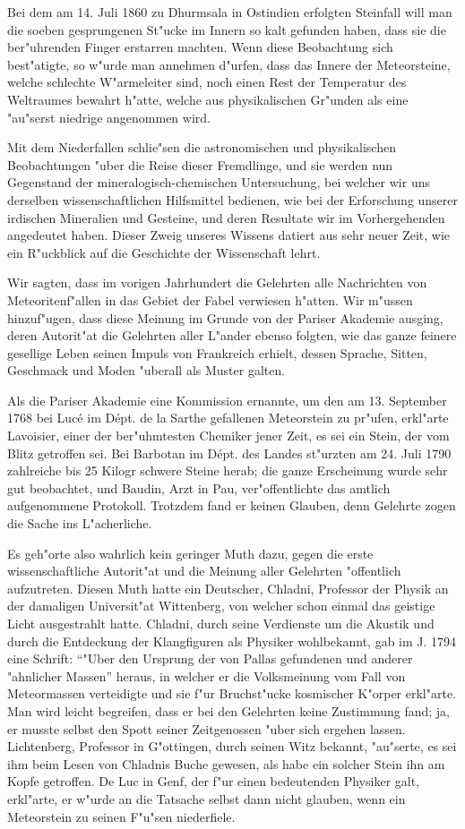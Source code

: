 \documentclass[a4paper, 11pt, oneside]{article}
\begin{document}
Bei dem am 14. Juli 1860 zu Dhurmsala in Ostindien erfolgten Steinfall will man die soeben gesprungenen St"ucke im Innern so kalt gefunden haben, dass sie die ber"uhrenden Finger erstarren machten. Wenn diese Beobachtung sich best"atigte, so w"urde man annehmen d"urfen, dass das Innere der Meteorsteine, welche schlechte W"armeleiter sind, noch einen Rest der Temperatur des Weltraumes bewahrt h"atte, welche aus physikalischen Gr"unden als eine "au"serst niedrige angenommen wird.

Mit dem Niederfallen schlie"sen die astronomischen und physikalischen Beobachtungen "uber die Reise dieser Fremdlinge, und sie werden nun Gegenstand der mineralogisch-chemischen Untersuchung, bei welcher wir uns derselben wissenschaftlichen Hilfsmittel bedienen, wie bei der Erforschung unserer irdischen Mineralien und Gesteine, und deren Resultate wir im Vorhergehenden angedeutet haben. Dieser Zweig unseres Wissens datiert aus sehr neuer Zeit, wie ein R"uckblick auf die Geschichte der Wissenschaft lehrt.

Wir sagten, dass im vorigen Jahrhundert die Gelehrten alle Nachrichten von Meteoritenf"allen in das Gebiet der Fabel verwiesen h"atten. Wir m"ussen hinzuf"ugen, dass diese Meinung im Grunde von der Pariser Akademie ausging, deren Autorit"at die Gelehrten aller L"ander ebenso folgten, wie das ganze feinere gesellige Leben seinen Impuls von Frankreich erhielt, dessen Sprache, Sitten, Geschmack und Moden "uberall als Muster galten.

Als die Pariser Akademie eine Kommission ernannte, um den am 13. September 1768 bei Lucé im Dépt. de la Sarthe gefallenen Meteorstein zu pr"ufen, erkl"arte Lavoisier, einer der ber"uhmtesten Chemiker jener Zeit, es sei ein Stein, der vom Blitz getroffen sei. Bei Barbotan im Dépt. des Landes st"urzten am 24. Juli 1790 zahlreiche bis 25 Kilogr schwere Steine herab; die ganze Erscheinung wurde sehr gut beobachtet, und Baudin, Arzt in Pau, ver"offentlichte das amtlich aufgenommene Protokoll. Trotzdem fand er keinen Glauben, denn Gelehrte zogen die Sache ins L"acherliche.

Es geh"orte also wahrlich kein geringer Muth dazu, gegen die erste wissenschaftliche Autorit"at und die Meinung aller Gelehrten "offentlich aufzutreten. Diesen Muth hatte ein Deutscher, Chladni, Professor der Physik an der damaligen Universit"at Wittenberg, von welcher schon einmal das geistige Licht ausgestrahlt hatte. Chladni, durch seine Verdienste um die Akustik und durch die Entdeckung der Klangfiguren als Physiker wohlbekannt, gab im J. 1794 eine Schrift: "`"Uber den Ursprung der von Pallas gefundenen und anderer "ahnlicher Massen"' heraus, in welcher er die Volksmeinung vom Fall von Meteormassen verteidigte und sie f"ur Bruchst"ucke kosmischer K"orper erkl"arte. Man wird leicht begreifen, dass er bei den Gelehrten keine Zustimmung fand; ja, er musste selbst den Spott seiner Zeitgenossen "uber sich ergehen lassen. Lichtenberg, Professor in G"ottingen, durch seinen Witz bekannt, "au"serte, es sei ihm beim Lesen von Chladnis Buche gewesen, als habe ein solcher Stein ihn am Kopfe getroffen. De Luc in Genf, der f"ur einen bedeutenden Physiker galt, erkl"arte, er w"urde an die Tatsache selbst dann nicht glauben, wenn ein Meteorstein zu seinen F"u"sen niederfiele.
\end{document}
